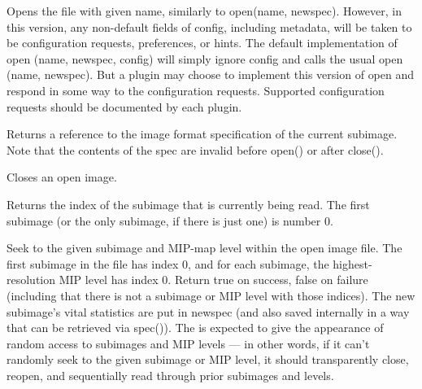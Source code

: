 \label{sec:inputwithconfig}

Opens the file with given name, similarly to {\cf open(name, newspec)}.
However, in this version, any non-default fields of {\cf config},
including metadata, will be taken to be configuration requests,
preferences, or hints.  The default implementation of 
{\cf open (name, newspec, config)} will simply ignore {\cf config} and
calls the usual {\cf open (name, newspec)}.  But a plugin may choose to
implement this version of {\cf open} and respond in some way to the
configuration requests.  Supported configuration requests should be
documented by each plugin.
\apiend

Returns a reference to the image format specification of the
current subimage.  Note that the contents of the spec are
invalid before {\kw open()} or after {\kw close()}.
\apiend

Closes an open image.
\apiend


Returns the index of the subimage that is currently being read.
The first subimage (or the only subimage, if there is just one) is
number 0.
\apiend



Seek to the given subimage and MIP-map level within the open image file.
The first subimage in the file has index 0, and for each subimage, the
highest-resolution MIP level has index 0.  Return {\kw true} on success,
{\kw false} on failure (including that there is not a subimage or MIP
level with those indices).  The new subimage's vital statistics are put
in {\kw newspec} (and also saved internally in a way that can be
retrieved via {\kw spec()}).  The \ImageInput is expected to give the
appearance of random access to subimages and MIP levels --- in other
words, if it can't randomly seek to the given subimage or MIP level, it
should transparently close, reopen, and sequentially read through prior
subimages and levels.

\apiend


